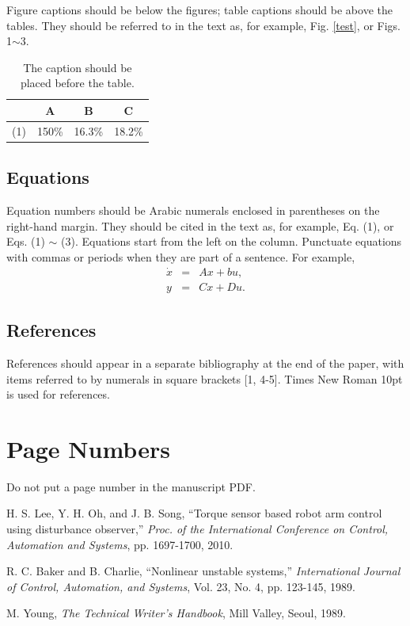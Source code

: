 \documentclass[fleqn,10pt,twocolumn]{ICCAS2018}
\begin{document}
Figure captions should be below the figures; table captions should be above the tables.
They should be referred to in the text as, for example, Fig. \ref{test}, or Figs.
1$\sim$3.
\begin{table}[htb]
\caption{The caption should be placed before the table.}
\begin{center}
\begin{tabular}{|c|c|c|c|}\hline
    &   A   &   B   &   C \\\hline
(1) & 150\% & 16.3\% & 18.2\% \\\hline
\end{tabular}
\end{center}
\end{table}

\subsection{Equations}
Equation numbers should be Arabic numerals enclosed in parentheses
on the right-hand margin. They should be cited in the text as, for
example, Eq. (1), or Eqs. (1) $\sim$ (3). Equations start from the
left on the column. Punctuate equations with commas or periods when
they are part of a sentence. For example,
\begin{eqnarray}
\dot{x}&=& Ax+bu, \\
y &=& Cx+Du.
\end{eqnarray}


\subsection{References} References should appear in a separate
bibliography at the end of the paper, with items referred to by
numerals in square brackets [1, 4-5]. Times New Roman 10pt is used
for references.

\section{Page Numbers}
Do not put a page number in the manuscript PDF.



%
\begin{thebibliography}{99}

H. S. Lee, Y. H. Oh, and J. B. Song, ``Torque sensor based robot arm control
using disturbance observer,'' {\it Proc. of the International Conference on
Control, Automation and Systems}, pp. 1697-1700, 2010.

R. C. Baker and B. Charlie,
``Nonlinear unstable systems,''
{\it International Journal of Control, Automation, and Systems},
Vol. 23, No. 4, pp. 123-145, 1989.

M. Young,
{\it The Technical Writer's Handbook},
Mill Valley, Seoul,
1989.



\end{thebibliography}
%
\end{document}

